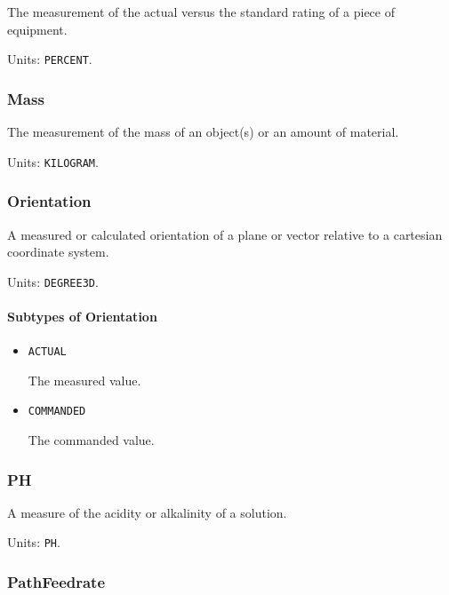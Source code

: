 The measurement of the actual versus the standard rating of a piece of equipment.


Units: \texttt{PERCENT}.

\subsubsection{Mass}
\label{sec:Mass}



The measurement of the mass of an object(s) or an amount of material.


Units: \texttt{KILOGRAM}.

\subsubsection{Orientation}
\label{sec:Orientation}



A measured or calculated orientation of a plane or vector relative to a cartesian coordinate system.


Units: \texttt{DEGREE\textunderscore 3D}.

\paragraph{Subtypes of Orientation}\mbox{}
\label{sec:Subtypes of Orientation}

\begin{itemize}

\item \texttt{ACTUAL}


The measured value.

\item \texttt{COMMANDED}


The commanded value.


\end{itemize}

\subsubsection{PH}
\label{sec:PH}



A measure of the acidity or alkalinity of a solution.


Units: \texttt{PH}.

\subsubsection{PathFeedrate}
\label{sec:PathFeedrate}



